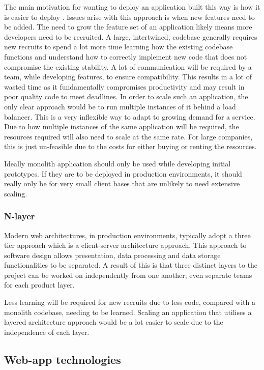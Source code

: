 The main motivation for wanting to deploy an application built this way is how it is easier to deploy \cite{namiot2014micro}.
Issues arise with this approach is when new features need to be added. The need to grow the feature set of an application likely means
more developers need to be recruited. A large, intertwined, codebase generally requires new recruits to spend a lot more time learning
how the existing codebase functions and understand how to correctly implement new code that does not compromise the existing stability.
A lot of communication will be required by a team, while developing features, to ensure compatibility.
This results in a lot of wasted time as it fundamentally compromises productivity and may result in poor quality code to meet deadlines.
In order to scale such an application, the only clear approach would be to run multiple instances of it behind a load balancer.
This is a very inflexible way to adapt to growing demand for a service.
Due to how multiple instances of the same application will be required, the resources required will also need to scale at the same rate.
For large companies, this is just un-feasible due to the costs for either buying or renting the resources. 

Ideally monolith application should only be used while developing initial prototypes. If they are to be deployed in production environments,
it should really only be for very small client bases that are unlikely to need extensive scaling.

\subsubsection{N-layer}

Modern web architectures, in production environments, typically adopt a three tier approach which is a client-server architecture approach.
This approach to software design allows presentation, data processing and data storage functionalities to be separated.
A result of this is that three distinct layers to the project can be worked on independently from one another; even separate teams for
each product layer. 

Less learning will be required for new recruits due to less code, compared with a monolith codebase, needing to be learned.
Scaling an application that utilises a layered architecture approach would be a lot easier to scale due to the independence of each layer.

\subsection{Web-app technologies}


